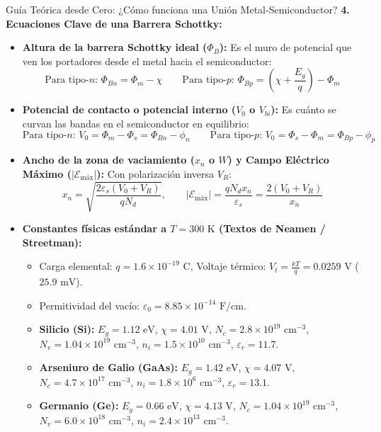 \documentclass[11pt,a4paper]{article}
\begin{document}
\begin{teoriabox}{Guía Teórica desde Cero: ¿Cómo funciona una Unión Metal-Semiconductor?}
\textbf{4. Ecuaciones Clave de una Barrera Schottky:}
\begin{itemize}
    \item \textbf{Altura de la barrera Schottky ideal ($\Phi_B$):} Es el muro de potencial que ven los portadores desde el metal hacia el semiconductor:
    \[
    \text{Para tipo-$n$: } \Phi_{Bn} = \Phi_m - \chi \qquad \text{Para tipo-$p$: } \Phi_{Bp} = \left(\chi + \frac{E_g}{q}\right) - \Phi_m
    \]
    \item \textbf{Potencial de contacto o potencial interno ($V_0$ o $V_{bi}$):} Es cuánto se curvan las bandas en el semiconductor en equilibrio:
    \[
    \text{Para tipo-$n$: } V_0 = \Phi_m - \Phi_s = \Phi_{Bn} - \phi_n \qquad \text{Para tipo-$p$: } V_0 = \Phi_s - \Phi_m = \Phi_{Bp} - \phi_p
    \]
    \item \textbf{Ancho de la zona de vaciamiento ($x_n$ o $W$) y Campo Eléctrico Máximo ($|\mathcal{E}_{\text{máx}}|$):} Con polarización inversa $V_R$:
    \[
    x_n = \sqrt{\frac{2\varepsilon_s (V_0 + V_R)}{q N_d}}, \qquad |\mathcal{E}_{\text{máx}}| = \frac{q N_d x_n}{\varepsilon_s} = \frac{2(V_0 + V_R)}{x_n}
    \]
    \item \textbf{Constantes físicas estándar a $T = 300\text{ K}$ (Textos de Neamen / Streetman):}
    \begin{itemize}
        \item Carga elemental: $q = 1.6 \times 10^{-19}\text{ C}$, Voltaje térmico: $V_t = \frac{kT}{q} = 0.0259\text{ V}$ ($25.9\text{ mV}$).
        \item Permitividad del vacío: $\varepsilon_0 = 8.85 \times 10^{-14}\text{ F/cm}$.
        \item \textbf{Silicio (Si):} $E_g = 1.12\text{ eV}$, $\chi = 4.01\text{ V}$, $N_c = 2.8 \times 10^{19}\text{ cm}^{-3}$, $N_v = 1.04 \times 10^{19}\text{ cm}^{-3}$, $n_i = 1.5 \times 10^{10}\text{ cm}^{-3}$, $\varepsilon_r = 11.7$.
        \item \textbf{Arseniuro de Galio (GaAs):} $E_g = 1.42\text{ eV}$, $\chi = 4.07\text{ V}$, $N_c = 4.7 \times 10^{17}\text{ cm}^{-3}$, $n_i = 1.8 \times 10^6\text{ cm}^{-3}$, $\varepsilon_r = 13.1$.
        \item \textbf{Germanio (Ge):} $E_g = 0.66\text{ eV}$, $\chi = 4.13\text{ V}$, $N_c = 1.04 \times 10^{19}\text{ cm}^{-3}$, $N_v = 6.0 \times 10^{18}\text{ cm}^{-3}$, $n_i = 2.4 \times 10^{13}\text{ cm}^{-3}$.
    \end{itemize}
\end{itemize}
\end{teoriabox}
\end{document}
